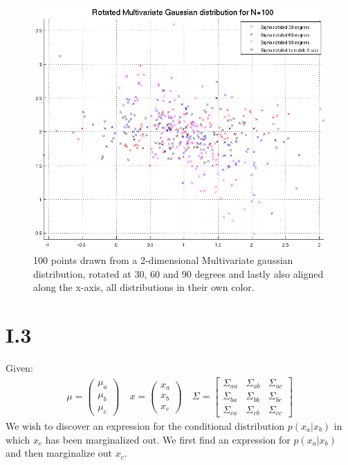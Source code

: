 \begin{figure}[h!]
	\includegraphics[width=\textwidth]{img/multigaussrotate}
	\caption{100 points drawn from a 2-dimensional Multivariate gaussian
          distribution, rotated at 30, 60 and 90 degrees and lastly also aligned
          along the x-axis, all distributions in their own
          color. \label{fig:I.2.4.1.rot}}
\end{figure}

\FloatBarrier
\pagebreak
\section*{I.3}
Given:
\begin{align*}
	\mu = \begin{pmatrix}
		\mu_a \\
		\mu_b \\
		\mu_c
	\end{pmatrix} \quad
	x = \begin{pmatrix}
		x_a \\
		x_b \\
		x_c
	\end{pmatrix} \quad
	\Sigma = \begin{bmatrix}
		\Sigma_{aa} & \Sigma_{ab} & \Sigma_{ac} \\
		\Sigma_{ba} & \Sigma_{bb} & \Sigma_{bc} \\
		\Sigma_{ca} & \Sigma_{cb} & \Sigma_{cc}
	\end{bmatrix}
\end{align*}
We wish to discover an expression for the conditional distribution $p(x_a|x_b)$
in which $x_c$ has been marginalized out. We first find an expression for
$p(x_a|x_b)$ and then marginalize out $x_c$.

